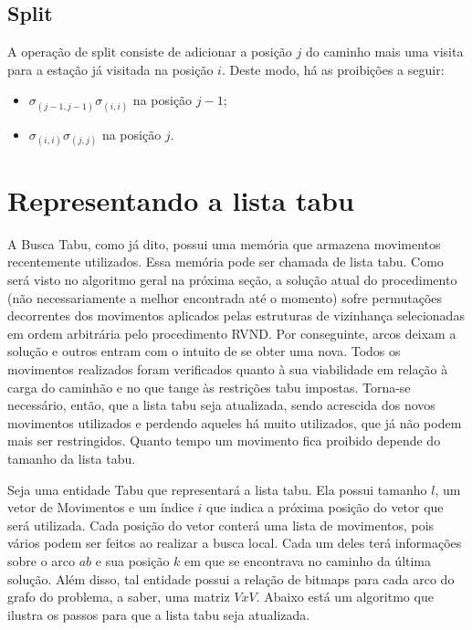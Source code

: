 \subsection{Split}\label{sec:LABEL_CHP_5_SUBSEC_D}

\par A operação de split consiste de adicionar a posição $j$ do caminho mais uma visita para a estação já visitada na posição $i$. Deste modo, há as proibições a seguir:

	\begin{itemize}
        \item $\sigma_{(j-1, j-1)}\sigma_{(i, i)}$ na posição $j-1$;
        \item $\sigma_{(i, i)}\sigma_{(j, j)}$ na posição $j$.
    \end{itemize}
    
    
\section{Representando a lista tabu}\label{sec:LABEL_CHP_6_SEC_D}

\par A Busca Tabu, como já dito, possui uma memória que armazena movimentos recentemente utilizados. Essa memória pode ser chamada de lista tabu. Como será visto no algoritmo geral na próxima seção, a solução atual do procedimento (não necessariamente a melhor encontrada até o momento) sofre permutações decorrentes dos movimentos aplicados pelas estruturas de vizinhança selecionadas em ordem arbitrária pelo procedimento RVND. Por conseguinte, arcos deixam a solução e outros entram com o intuito de se obter uma nova. Todos os movimentos realizados foram verificados quanto à sua viabilidade em relação à carga do caminhão e no que tange às restrições tabu impostas. Torna-se necessário, então, que a lista tabu seja atualizada, sendo acrescida dos novos movimentos utilizados e perdendo aqueles há muito utilizados, que já não podem mais ser restringidos. Quanto tempo um movimento fica proibido depende do tamanho da lista tabu.

\par Seja uma entidade Tabu que representará a lista tabu. Ela possui tamanho $l$, um vetor de Movimentos e um índice $i$ que indica a próxima posição do vetor que será utilizada. Cada posição do vetor conterá uma lista de movimentos, pois vários podem ser feitos ao realizar a busca local. Cada um deles terá informações sobre o arco $ab$ e sua posição $k$ em que se encontrava no caminho da última solução. Além disso, tal entidade possui a relação de bitmaps para cada arco do grafo do problema, a saber, uma matriz $VxV$. Abaixo está um algoritmo que ilustra os passos para que a lista tabu seja atualizada.

